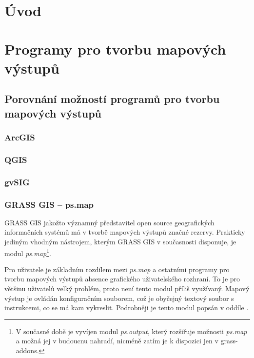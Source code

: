 \documentclass[a4paper,12pt,draft]{article}
\author{Anna Kratochvílová}
\newcommand{\modul}[1]{\emph{#1}}
\begin{document}
\tableofcontents
\renewcommand{\refname}{Použité zdroje}

\section{Úvod}

\section{Programy pro tvorbu mapových výstupů}

\subsection{Porovnání možností programů pro tvorbu mapových výstupů}

\subsubsection{ArcGIS}

\subsubsection{QGIS}

\subsubsection{gvSIG}

\subsubsection{GRASS GIS -- ps.map}
\label{sec:porovnani:psmap}
GRASS GIS jakožto významný představitel open source geografických informačních systémů má v tvorbě mapových výstupů značné rezervy. Prakticky jediným vhodným nástrojem, kterým GRASS GIS v současnosti disponuje, je modul \modul{ps.map}\footnote{V současné době je vyvíjen modul \modul{ps.output}, který rozšiřuje možnosti \modul{ps.map} a možná jej v budoucnu nahradí, nicméně zatím je k dispozici jen v grass-addons.}.

Pro uživatele je základním rozdílem mezi \modul{ps.map} a ostatními programy pro tvorbu mapových výstupů  absence grafického uživatelského rozhraní. To je pro většinu uživatelů velký problém, proto není tento modul příliš využívaný. Mapový výstup je ovládán konfiguračním souborem, což je obyčejný textový soubor s instrukcemi, co se má kam vykreslit. Podrobněji je tento modul popsán v oddíle .
\end{document}
